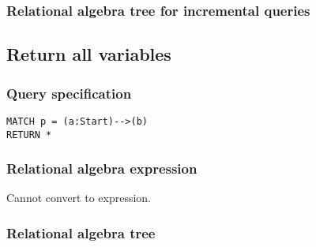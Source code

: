 
\subsubsection*{Relational algebra tree for incremental queries}


\subsection{Return all variables}

\subsubsection*{Query specification}

\begin{lstlisting}
MATCH p = (a:Start)-->(b)
RETURN *
\end{lstlisting}

\subsubsection*{Relational algebra expression}

Cannot convert to expression.

\subsubsection*{Relational algebra tree}

